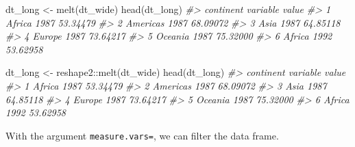 \documentclass[
]{book}
\newenvironment{Shaded}{\begin{snugshade}}{\end{snugshade}}
\newcommand{\CommentTok}[1]{\textcolor[rgb]{0.56,0.35,0.01}{\textit{#1}}}
\newcommand{\FunctionTok}[1]{\textcolor[rgb]{0.00,0.00,0.00}{#1}}
\newcommand{\NormalTok}[1]{#1}
\newcommand{\OtherTok}[1]{\textcolor[rgb]{0.56,0.35,0.01}{#1}}
\newcommand{\SpecialCharTok}[1]{\textcolor[rgb]{0.00,0.00,0.00}{#1}}
\begin{document}
\begin{Shaded}
\begin{Highlighting}[]
\NormalTok{dt\_long }\OtherTok{\textless{}{-}} \FunctionTok{melt}\NormalTok{(dt\_wide)}
\FunctionTok{head}\NormalTok{(dt\_long)}
\CommentTok{\#\textgreater{}   continent variable    value}
\CommentTok{\#\textgreater{} 1    Africa     1987 53.34479}
\CommentTok{\#\textgreater{} 2  Americas     1987 68.09072}
\CommentTok{\#\textgreater{} 3      Asia     1987 64.85118}
\CommentTok{\#\textgreater{} 4    Europe     1987 73.64217}
\CommentTok{\#\textgreater{} 5   Oceania     1987 75.32000}
\CommentTok{\#\textgreater{} 6    Africa     1992 53.62958}

\NormalTok{dt\_long }\OtherTok{\textless{}{-}}\NormalTok{ reshape2}\SpecialCharTok{::}\FunctionTok{melt}\NormalTok{(dt\_wide)}
\FunctionTok{head}\NormalTok{(dt\_long)}
\CommentTok{\#\textgreater{}   continent variable    value}
\CommentTok{\#\textgreater{} 1    Africa     1987 53.34479}
\CommentTok{\#\textgreater{} 2  Americas     1987 68.09072}
\CommentTok{\#\textgreater{} 3      Asia     1987 64.85118}
\CommentTok{\#\textgreater{} 4    Europe     1987 73.64217}
\CommentTok{\#\textgreater{} 5   Oceania     1987 75.32000}
\CommentTok{\#\textgreater{} 6    Africa     1992 53.62958}
\end{Highlighting}
\end{Shaded}

With the argument \texttt{measure.vars=}, we can filter the data frame.
\end{document}
